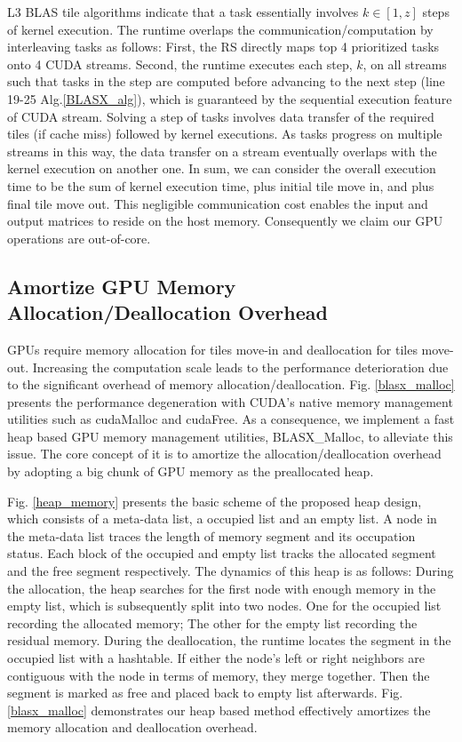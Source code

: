 \documentclass[conference]{IEEEtran}
\begin{document}
L3 BLAS tile algorithms indicate that a task essentially involves $k \in [1, z]$ steps of kernel execution.
The runtime overlaps the communication/computation by interleaving tasks as follows: 
First, the RS directly maps top 4 prioritized tasks onto 4 CUDA streams. 
Second, the runtime executes each step, $k$, on all streams such that tasks in the step are computed before 
advancing to the next step (line 19-25 Alg.\ref{BLASX_alg}), which is guaranteed by the sequential execution 
feature of CUDA stream. Solving a step of tasks involves data transfer of the required tiles (if cache miss) followed 
by kernel executions. As tasks progress on multiple streams in this way, the data transfer on a stream eventually overlaps 
with the kernel execution on another one. In sum, we can consider the overall execution time to be the sum of kernel execution time, plus 
initial tile move in, and plus final tile move out. This negligible communication cost enables the input and output matrices to 
reside on the host memory. Consequently we claim our GPU operations are out-of-core.


\vspace{-0.12in}
\subsection{Amortize GPU Memory Allocation/Deallocation Overhead}
\vspace{-0.05in}
GPUs require memory allocation for tiles move-in and deallocation for tiles move-out. 
Increasing the computation scale leads to the performance deterioration due to
the significant overhead of memory allocation/deallocation. Fig. \ref{blasx_malloc} 
presents the performance degeneration with CUDA's native memory management utilities 
such as cudaMalloc and cudaFree. As a consequence, we implement a fast heap based GPU memory 
management utilities, BLASX\_Malloc, to alleviate this issue. The core concept of it is to 
amortize the allocation/deallocation overhead by adopting a big chunk of GPU memory 
as the preallocated heap.

Fig. \ref{heap_memory} presents the basic scheme of the proposed heap design,
which consists of a meta-data list, a occupied list and an empty list. A node 
in the meta-data list traces the length of memory segment and its occupation status. 
Each block of the occupied and empty list tracks the allocated segment and the free segment 
respectively. The dynamics of this heap is as follows:
During the allocation, the heap searches for the first node with enough memory in the empty list, 
which is subsequently split into two nodes. One for the occupied list recording the allocated 
memory; The other for the empty list recording the residual memory. During the deallocation, 
the runtime locates the segment in the occupied list with a hashtable. If either the 
node's left or right neighbors are contiguous with the node in terms of memory, they merge together. 
Then the segment is marked as free and placed back to empty list afterwards.
Fig. \ref{blasx_malloc} demonstrates our heap based method effectively amortizes the memory 
allocation and deallocation overhead.
\end{document}
